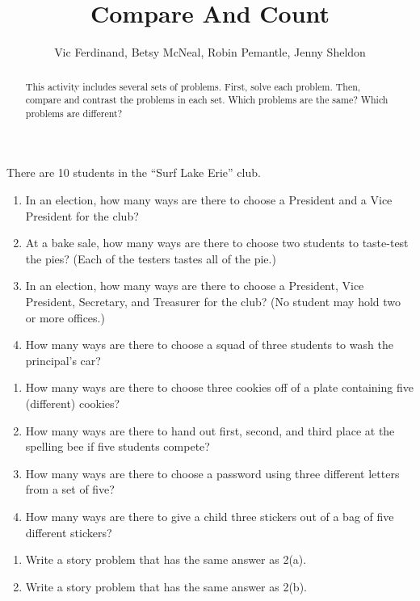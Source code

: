 \documentclass[nooutcomes]{ximera}
\title{Compare And Count}
\author{Vic Ferdinand, Betsy McNeal, Robin Pemantle, Jenny Sheldon}
\begin{document}
\begin{abstract}
This activity includes several sets of problems.  First, solve each problem.  Then, compare and contrast the problems in each set.  Which problems are the same?  Which problems are different?
\end{abstract}
\maketitle



\begin{problem}
There are 10 students in the ``Surf Lake Erie'' club.
\begin{enumerate}
\item In an election, how many ways are there to choose a President and a Vice President for the club?
\item At a bake sale, how many ways are there to choose two students to taste-test the pies? (Each of the testers tastes all of the pie.)
\item In an election, how many ways are there to choose a President, Vice President, Secretary, and Treasurer for the club?  (No student may hold two or more offices.)
\item How many ways are there to choose a squad of three students to wash the principal's car?

\end{enumerate}
\end{problem}

\begin{problem}
\begin{enumerate}
\item How many ways are there to choose three cookies off of a plate containing five (different) cookies?
\item How many ways are there to hand out first, second, and third place at the spelling bee if five students compete?
\item How many ways are there to choose a password using three different letters from a set of five?
\item How many ways are there to give a child three stickers out of a bag of five different stickers?
\end{enumerate}
\end{problem}


\begin{problem}
\begin{enumerate}
\item Write a story problem that has the same answer as 2(a).
\item Write a story problem that has the same answer as 2(b).
\end{enumerate}
\end{problem}
\end{document}
